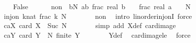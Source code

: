 \begin{isabellebody}
\ \ \isamarkupfalse%
\ False\ \isanewline
\ \ \ \ \ non{\isacharcolon}{\kern0pt}\ {\isachardoublequoteopen}{\isasymnot}\ {\isacharparenleft}{\kern0pt}{\isasymexists}b{\isasymle}N{\isachardot}{\kern0pt}\ {\isasymexists}a{\isacharless}{\kern0pt}b{\isachardot}{\kern0pt}\ {\isasymbar}frac\ {\isacharparenleft}{\kern0pt}real\ b\ {\isacharasterisk}{\kern0pt}\ {\isasymtheta}{\isacharparenright}{\kern0pt}\ {\isacharminus}{\kern0pt}\ frac\ {\isacharparenleft}{\kern0pt}real\ a\ {\isacharasterisk}{\kern0pt}\ {\isasymtheta}{\isacharparenright}{\kern0pt}{\isasymbar}\ {\isacharless}{\kern0pt}\ {}{\isacharslash}{\kern0pt}N{\isacharparenright}{\kern0pt}{\isachardoublequoteclose}\isanewline
\ \ \isamarkupfalse%
\ {\isacharminus}{\kern0pt}\isanewline
\ \ \ \ \isamarkupfalse%
\ {\isachardoublequoteopen}inj{\isacharunderscore}{\kern0pt}on\ {\isacharparenleft}{\kern0pt}{\isasymlambda}k{\isacharcolon}{\kern0pt}{\isacharcolon}{\kern0pt}nat{\isachardot}{\kern0pt}\ frac\ {\isacharparenleft}{\kern0pt}k{\isacharasterisk}{\kern0pt}{\isasymtheta}{\isacharparenright}{\kern0pt}{\isacharparenright}{\kern0pt}\ {\isacharbraceleft}{\kern0pt}{\isachardot}{\kern0pt}{\isachardot}{\kern0pt}N{\isacharbraceright}{\kern0pt}{\isachardoublequoteclose}\isanewline
\ \ \ \ \ \ \isamarkupfalse%
\ non\ \isamarkupfalse%
\ {\isacharparenleft}{\kern0pt}intro\ linorder{\isacharunderscore}{\kern0pt}inj{\isacharunderscore}{\kern0pt}onI{\isacharsemicolon}{\kern0pt}\ force{\isacharparenright}{\kern0pt}\isanewline
\ \ \ \ \isamarkupfalse%
\ \isamarkupfalse%
\ caX{\isacharcolon}{\kern0pt}\ {\isachardoublequoteopen}card\ X\ {\isacharequal}{\kern0pt}\ Suc\ N{\isachardoublequoteclose}\isanewline
\ \ \ \ \ \ \isamarkupfalse%
\ {\isacharparenleft}{\kern0pt}simp\ add{\isacharcolon}{\kern0pt}\ X{\isacharunderscore}{\kern0pt}def\ card{\isacharunderscore}{\kern0pt}image{\isacharparenright}{\kern0pt}\isanewline
\ \ \ \ \isamarkupfalse%
\ caY{\isacharcolon}{\kern0pt}\ {\isachardoublequoteopen}card\ Y\ {\isasymle}\ N{\isachardoublequoteclose}\ {\isachardoublequoteopen}finite\ Y{\isachardoublequoteclose}\isanewline
\ \ \ \ \ \ \isamarkupfalse%
\ Y{\isacharunderscore}{\kern0pt}def\ \isamarkupfalse%
\ card{\isacharunderscore}{\kern0pt}image{\isacharunderscore}{\kern0pt}le\ \isamarkupfalse%
\ force{\isacharplus}{\kern0pt}\isanewline
\ \ \ \ \isamarkupfalse%

\end{isabellebody}
